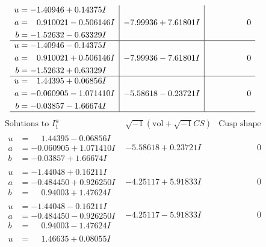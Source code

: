 \documentclass[1p]{elsarticle_modified}
\theoremstyle{definition}
\newcommand{\I}{\sqrt{-1}}
\begin{document}
$$\begin{array}{c|c|c}
\begin{aligned}
u &= -1.40946 + 0.14375 I \\
a &= \phantom{-}0.910021 - 0.506146 I \\
b &= -1.52632 - 0.63329 I\end{aligned}
 & -7.99936 + 7.61801 I & \phantom{-0.000000 } 0 \\ \hline\begin{aligned}
u &= -1.40946 - 0.14375 I \\
a &= \phantom{-}0.910021 + 0.506146 I \\
b &= -1.52632 + 0.63329 I\end{aligned}
 & -7.99936 - 7.61801 I & \phantom{-0.000000 } 0 \\ \hline\begin{aligned}
u &= \phantom{-}1.44395 + 0.06856 I \\
a &= -0.060905 - 1.071410 I \\
b &= -0.03857 - 1.66674 I\end{aligned}
 & -5.58618 - 0.23721 I & \phantom{-0.000000 } 0\\
 \hline 
 \end{array}$$\newpage$$\begin{array}{c|c|c}  
\text{Solutions to }I^u_{1}& \I (\text{vol} + \sqrt{-1}CS) & \text{Cusp shape}\\
 \hline 
\begin{aligned}
u &= \phantom{-}1.44395 - 0.06856 I \\
a &= -0.060905 + 1.071410 I \\
b &= -0.03857 + 1.66674 I\end{aligned}
 & -5.58618 + 0.23721 I & \phantom{-0.000000 } 0 \\ \hline\begin{aligned}
u &= -1.44048 + 0.16211 I \\
a &= -0.484450 + 0.926250 I \\
b &= \phantom{-}0.94003 + 1.47624 I\end{aligned}
 & -4.25117 + 5.91833 I & \phantom{-0.000000 } 0 \\ \hline\begin{aligned}
u &= -1.44048 - 0.16211 I \\
a &= -0.484450 - 0.926250 I \\
b &= \phantom{-}0.94003 - 1.47624 I\end{aligned}
 & -4.25117 - 5.91833 I & \phantom{-0.000000 } 0 \\ \hline\begin{aligned}
u &= \phantom{-}1.46635 + 0.08055 I \\

\end{aligned}
\end{array}$$
\end{document}
